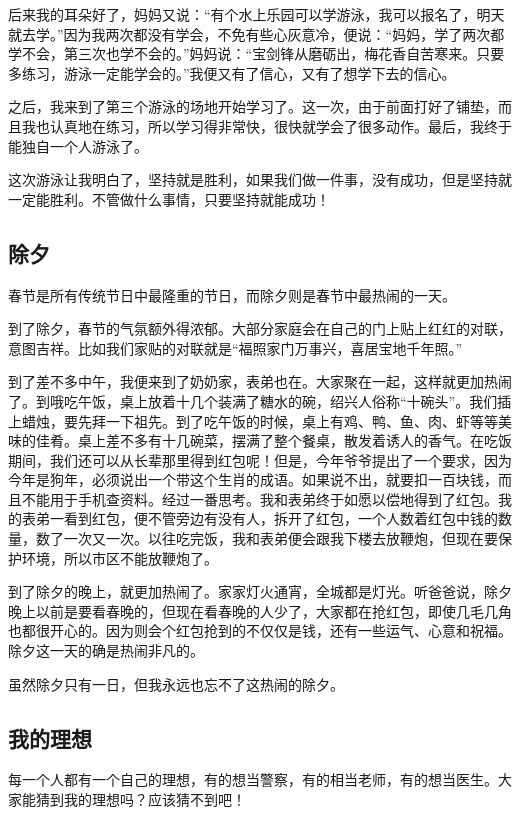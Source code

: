 \documentclass[UTF8,a4paper,titlepage,twoside,10.5pt]{article}
\begin{document}
后来我的耳朵好了，妈妈又说：“有个水上乐园可以学游泳，我可以报名了，明天就去学。”因为我两次都没有学会，不免有些心灰意冷，便说：“妈妈，学了两次都学不会，第三次也学不会的。”妈妈说：“宝剑锋从磨砺出，梅花香自苦寒来。只要多练习，游泳一定能学会的。”我便又有了信心，又有了想学下去的信心。

之后，我来到了第三个游泳的场地开始学习了。这一次，由于前面打好了铺垫，而且我也认真地在练习，所以学习得非常快，很快就学会了很多动作。最后，我终于能独自一个人游泳了。

这次游泳让我明白了，坚持就是胜利，如果我们做一件事，没有成功，但是坚持就一定能胜利。不管做什么事情，只要坚持就能成功！

\subsection{除夕}
\label{sec:org51669b2}

春节是所有传统节日中最隆重的节日，而除夕则是春节中最热闹的一天。

到了除夕，春节的气氛额外得浓郁。大部分家庭会在自己的门上贴上红红的对联，意图吉祥。比如我们家贴的对联就是“福照家门万事兴，喜居宝地千年照。”

到了差不多中午，我便来到了奶奶家，表弟也在。大家聚在一起，这样就更加热闹了。到哦吃午饭，桌上放着十几个装满了糖水的碗，绍兴人俗称“十碗头”。我们插上蜡烛，要先拜一下祖先。到了吃午饭的时候，桌上有鸡、鸭、鱼、肉、虾等等美味的佳肴。桌上差不多有十几碗菜，摆满了整个餐桌，散发着诱人的香气。在吃饭期间，我们还可以从长辈那里得到红包呢！但是，今年爷爷提出了一个要求，因为今年是狗年，必须说出一个带这个生肖的成语。如果说不出，就要扣一百块钱，而且不能用于手机查资料。经过一番思考。我和表弟终于如愿以偿地得到了红包。我的表弟一看到红包，便不管旁边有没有人，拆开了红包，一个人数着红包中钱的数量，数了一次又一次。以往吃完饭，我和表弟便会跟我下楼去放鞭炮，但现在要保护环境，所以市区不能放鞭炮了。

到了除夕的晚上，就更加热闹了。家家灯火通宵，全城都是灯光。听爸爸说，除夕晚上以前是要看春晚的，但现在看春晚的人少了，大家都在抢红包，即使几毛几角也都很开心的。因为则会个红包抢到的不仅仅是钱，还有一些运气、心意和祝福。除夕这一天的确是热闹非凡的。

虽然除夕只有一日，但我永远也忘不了这热闹的除夕。

\subsection{我的理想}
\label{sec:org792e677}

每一个人都有一个自己的理想，有的想当警察，有的相当老师，有的想当医生。大家能猜到我的理想吗？应该猜不到吧！
\end{document}
